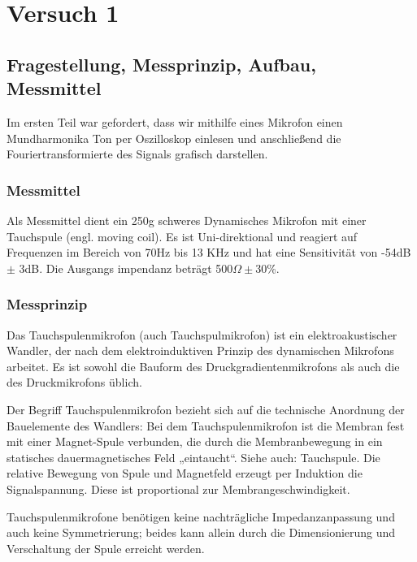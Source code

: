 \documentclass[TGAI_Laborbericht.tex]{subfiles}
\begin{document}
\chapter{Versuch 1}
\label{chap:VERSUCH_1}


\section{Fragestellung, Messprinzip, Aufbau, Messmittel}
\label{chap:VERSUCH_1_FRAGESTELLUNG}

Im ersten Teil war gefordert, dass wir mithilfe eines Mikrofon einen Mundharmonika Ton per Oszilloskop einlesen und anschließend die Fouriertransformierte des Signals grafisch darstellen.

\subsection{Messmittel}
Als Messmittel dient ein 250g schweres Dynamisches Mikrofon mit einer Tauchspule (engl. moving coil). Es ist Uni-direktional und reagiert auf Frequenzen im Bereich von 70Hz bis 13 KHz und hat eine Sensitivität von -54dB $\pm$ 3dB. Die Ausgangs impendanz beträgt 500$\Omega \pm$30\%.

\subsection{Messprinzip}
Das Tauchspulenmikrofon (auch Tauchspulmikrofon) ist ein elektroakustischer Wandler, der nach dem elektroinduktiven Prinzip des dynamischen Mikrofons arbeitet. Es ist sowohl die Bauform des Druckgradientenmikrofons als auch die des Druckmikrofons üblich.

Der Begriff Tauchspulenmikrofon bezieht sich auf die technische Anordnung der Bauelemente des Wandlers: Bei dem Tauchspulenmikrofon ist die Membran fest mit einer Magnet-Spule verbunden, die durch die Membranbewegung in ein statisches dauermagnetisches Feld „eintaucht“. Siehe auch: Tauchspule. Die relative Bewegung von Spule und Magnetfeld erzeugt per Induktion die Signalspannung. Diese ist proportional zur Membrangeschwindigkeit.

Tauchspulenmikrofone benötigen keine nachträgliche Impedanzanpassung und auch keine Symmetrierung; beides kann allein durch die Dimensionierung und Verschaltung der Spule erreicht werden.
\end{document}
